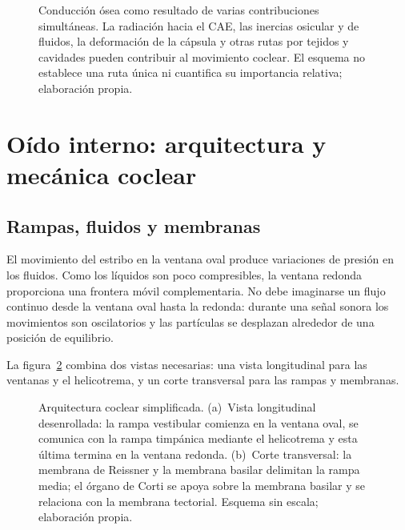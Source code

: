 \begin{figure}[htbp]
    \centering
    
    \caption{Conducción ósea como resultado de varias contribuciones
    simultáneas. La radiación hacia el CAE, las inercias osicular y de fluidos,
    la deformación de la cápsula y otras rutas por tejidos y cavidades pueden
    contribuir al movimiento coclear. El esquema no establece una ruta única
    ni cuantifica su importancia relativa; elaboración propia.}
    \label{fig:u6-conduccion-osea}
\end{figure}

\section{Oído interno: arquitectura y mecánica coclear}
\label{sec:u6-oido-interno}

\subsection{Rampas, fluidos y membranas}
\label{sec:u6-rampas-fluidos}



El movimiento del estribo en la ventana oval produce variaciones de presión
en los fluidos. Como los líquidos son poco compresibles, la ventana redonda
proporciona una frontera móvil complementaria. No debe imaginarse un flujo
continuo desde la ventana oval hasta la redonda: durante una señal sonora los
movimientos son oscilatorios y las partículas se desplazan alrededor de una
posición de equilibrio.

La figura~\ref{fig:u6-arquitectura-coclear} combina dos vistas necesarias:
una vista longitudinal para las ventanas y el helicotrema, y un corte
transversal para las rampas y membranas.

\begin{figure}[htbp]
    \centering
    
    \caption{Arquitectura coclear simplificada. (a)~Vista longitudinal
    desenrollada: la rampa vestibular comienza en la ventana oval, se comunica
    con la rampa timpánica mediante el helicotrema y esta última termina en la
    ventana redonda. (b)~Corte transversal: la membrana de Reissner y la
    membrana basilar delimitan la rampa media; el órgano de Corti se apoya
    sobre la membrana basilar y se relaciona con la membrana tectorial. Esquema
    sin escala; elaboración propia.}
    \label{fig:u6-arquitectura-coclear}
\end{figure}

